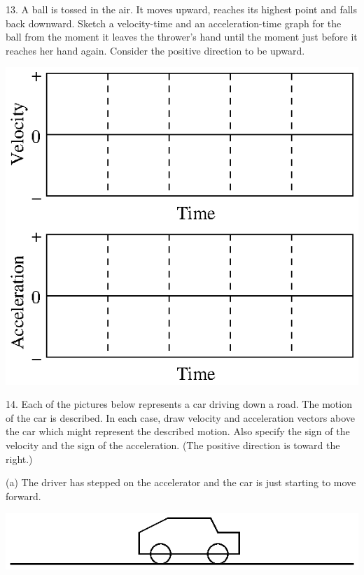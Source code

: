 13. A ball is tossed in the air. It moves upward, reaches its highest point
and falls back downward. Sketch a velocity-time and an acceleration-time graph
for the ball from the moment it leaves the thrower's hand until the moment just
before it reaches her hand again. Consider the positive direction to be upward.

\vspace{0.3cm}
{\par\centering \includegraphics{slowing/slowing_fig15.eps} \par}
\vspace{0.3cm}

14. Each of the pictures below represents a car driving down a road. The motion
of the car is described. In each case, draw velocity and acceleration vectors
above the car which might represent the described motion. Also specify the sign
of the velocity and the sign of the acceleration. (The positive direction is toward the right.)

(a) The driver has stepped on the accelerator and the car is just starting to
move forward.

\vspace{0.3cm}
{\par\centering \includegraphics{slowing/slowing_fig16.eps} \par}
\vspace{0.3cm}

